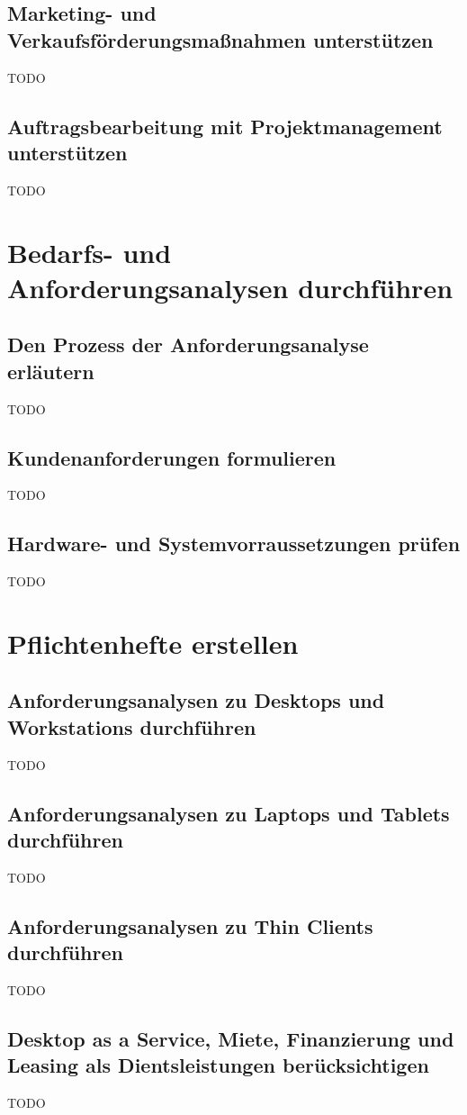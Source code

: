\documentclass[11pt]{article}
\begin{document}
\subsection{Marketing- und Verkaufsförderungsmaßnahmen unterstützen}
    TODO
\subsection{Auftragsbearbeitung mit Projektmanagement unterstützen}
    TODO

\newpage
\section{Bedarfs- und Anforderungsanalysen durchführen}
\subsection{Den Prozess der Anforderungsanalyse erläutern}
    TODO
\subsection{Kundenanforderungen formulieren}
    TODO
\subsection{Hardware- und Systemvorraussetzungen prüfen}
    TODO

\newpage
\section{Pflichtenhefte erstellen}
\subsection{Anforderungsanalysen zu Desktops und Workstations durchführen}
    TODO
\subsection{Anforderungsanalysen zu Laptops und Tablets durchführen}
    TODO
\subsection{Anforderungsanalysen zu Thin Clients durchführen}
    TODO
\subsection{Desktop as a Service, Miete, Finanzierung und Leasing als Dientsleistungen berücksichtigen}
    TODO
\end{document}
